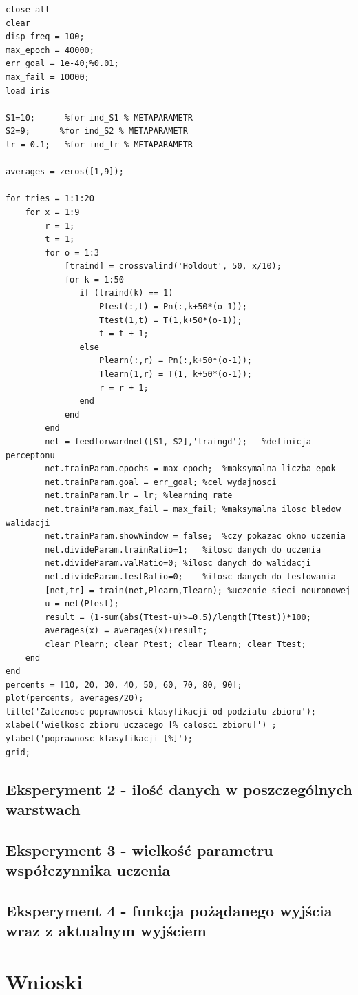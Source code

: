 \documentclass[a4paper, 12pt]{report}
\begin{document}
\begin{lstlisting}[frame=single]  % Start your code-block
close all
clear
disp_freq = 100;
max_epoch = 40000;
err_goal = 1e-40;%0.01;
max_fail = 10000;
load iris

S1=10;      %for ind_S1 % METAPARAMETR
S2=9;      %for ind_S2 % METAPARAMETR
lr = 0.1;   %for ind_lr % METAPARAMETR

averages = zeros([1,9]);

for tries = 1:1:20
    for x = 1:9
        r = 1;
        t = 1;
        for o = 1:3
            [traind] = crossvalind('Holdout', 50, x/10);
            for k = 1:50
               if (traind(k) == 1)
                   Ptest(:,t) = Pn(:,k+50*(o-1));
                   Ttest(1,t) = T(1,k+50*(o-1));
                   t = t + 1;
               else
                   Plearn(:,r) = Pn(:,k+50*(o-1));
                   Tlearn(1,r) = T(1, k+50*(o-1));
                   r = r + 1;
               end
            end
        end
        net = feedforwardnet([S1, S2],'traingd');   %definicja perceptonu
        net.trainParam.epochs = max_epoch;  %maksymalna liczba epok
        net.trainParam.goal = err_goal; %cel wydajnosci
        net.trainParam.lr = lr; %learning rate
        net.trainParam.max_fail = max_fail; %maksymalna ilosc bledow walidacji
        net.trainParam.showWindow = false;  %czy pokazac okno uczenia
        net.divideParam.trainRatio=1;   %ilosc danych do uczenia
        net.divideParam.valRatio=0; %ilosc danych do walidacji
        net.divideParam.testRatio=0;    %ilosc danych do testowania
        [net,tr] = train(net,Plearn,Tlearn); %uczenie sieci neuronowej
        u = net(Ptest);
        result = (1-sum(abs(Ttest-u)>=0.5)/length(Ttest))*100;
        averages(x) = averages(x)+result;
        clear Plearn; clear Ptest; clear Tlearn; clear Ttest;
    end
end
percents = [10, 20, 30, 40, 50, 60, 70, 80, 90];
plot(percents, averages/20);
title('Zaleznosc poprawnosci klasyfikacji od podzialu zbioru');
xlabel('wielkosc zbioru uczacego [% calosci zbioru]') ;
ylabel('poprawnosc klasyfikacji [%]');
grid;
\end{lstlisting}




\section{Eksperyment 2 - ilość danych w poszczególnych warstwach}

\section{Eksperyment 3 - wielkość parametru współczynnika uczenia}

\section{Eksperyment 4 - funkcja pożądanego wyjścia wraz z aktualnym wyjściem}

\chapter{Wnioski}



\end{document}
